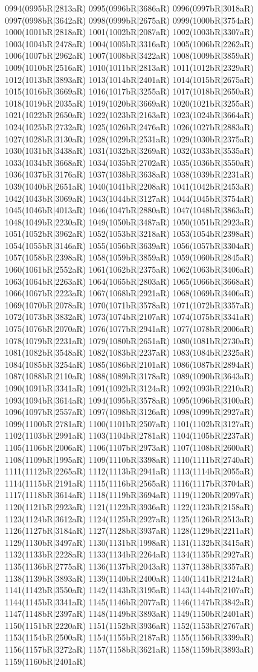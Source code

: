 0994(0995bR|2813aR) 0995(0996bR|3686aR) 0996(0997bR|3018aR) 0997(0998bR|3642aR) 0998(0999bR|2675aR) 0999(1000bR|3754aR) 1000(1001bR|2818aR) 1001(1002bR|2087aR) 1002(1003bR|3307aR) 1003(1004bR|2478aR) 1004(1005bR|3316aR) 1005(1006bR|2262aR) 1006(1007bR|2962aR) 1007(1008bR|3422aR) 1008(1009bR|3859aR) 1009(1010bR|2516aR) 1010(1011bR|2813aR) 1011(1012bR|2329aR) 1012(1013bR|3893aR) 1013(1014bR|2401aR) 1014(1015bR|2675aR) 1015(1016bR|3669aR) 1016(1017bR|3255aR) 1017(1018bR|2650aR) 1018(1019bR|2035aR) 1019(1020bR|3669aR) 1020(1021bR|3255aR) 1021(1022bR|2650aR) 1022(1023bR|2163aR) 1023(1024bR|3664aR) 1024(1025bR|2732aR) 1025(1026bR|2476aR) 1026(1027bR|2883aR) 1027(1028bR|3130aR) 1028(1029bR|2531aR) 1029(1030bR|2375aR) 1030(1031bR|3438aR) 1031(1032bR|3269aR) 1032(1033bR|3535aR) 1033(1034bR|3668aR) 1034(1035bR|2702aR) 1035(1036bR|3550aR) 1036(1037bR|3176aR) 1037(1038bR|3638aR) 1038(1039bR|2231aR) 1039(1040bR|2651aR) 1040(1041bR|2208aR) 1041(1042bR|2453aR) 1042(1043bR|3069aR) 1043(1044bR|3127aR) 1044(1045bR|3754aR) 1045(1046bR|4013aR) 1046(1047bR|2880aR) 1047(1048bR|3863aR) 1048(1049bR|2230aR) 1049(1050bR|3487aR) 1050(1051bR|2923aR) 1051(1052bR|3962aR) 1052(1053bR|3218aR) 1053(1054bR|2398aR) 1054(1055bR|3146aR) 1055(1056bR|3639aR) 1056(1057bR|3304aR) 1057(1058bR|2398aR) 1058(1059bR|3859aR) 1059(1060bR|2845aR) 1060(1061bR|2552aR) 1061(1062bR|2375aR) 1062(1063bR|3406aR) 1063(1064bR|2263aR) 1064(1065bR|2803aR) 1065(1066bR|3668aR) 1066(1067bR|2223aR) 1067(1068bR|2921aR) 1068(1069bR|3406aR) 1069(1070bR|2078aR) 1070(1071bR|3578aR) 1071(1072bR|3357aR) 1072(1073bR|3832aR) 1073(1074bR|2107aR) 1074(1075bR|3341aR) 1075(1076bR|2070aR) 1076(1077bR|2941aR) 1077(1078bR|2006aR) 1078(1079bR|2231aR) 1079(1080bR|2651aR) 1080(1081bR|2730aR) 1081(1082bR|3548aR) 1082(1083bR|2237aR) 1083(1084bR|2325aR) 1084(1085bR|3254aR) 1085(1086bR|2101aR) 1086(1087bR|2894aR) 1087(1088bR|2110aR) 1088(1089bR|3178aR) 1089(1090bR|3643aR) 1090(1091bR|3341aR) 1091(1092bR|3124aR) 1092(1093bR|2210aR) 1093(1094bR|3614aR) 1094(1095bR|3578aR) 1095(1096bR|3100aR) 1096(1097bR|2557aR) 1097(1098bR|3126aR) 1098(1099bR|2927aR) 1099(1100bR|2781aR) 1100(1101bR|2507aR) 1101(1102bR|3127aR) 1102(1103bR|2991aR) 1103(1104bR|2781aR) 1104(1105bR|2237aR) 1105(1106bR|2006aR) 1106(1107bR|2973aR) 1107(1108bR|2600aR) 1108(1109bR|1995aR) 1109(1110bR|3398aR) 1110(1111bR|2740aR) 1111(1112bR|2265aR) 1112(1113bR|2941aR) 1113(1114bR|2055aR) 1114(1115bR|2191aR) 1115(1116bR|2565aR) 1116(1117bR|3704aR) 1117(1118bR|3614aR) 1118(1119bR|3694aR) 1119(1120bR|2097aR) 1120(1121bR|2923aR) 1121(1122bR|3936aR) 1122(1123bR|2158aR) 1123(1124bR|3612aR) 1124(1125bR|2927aR) 1125(1126bR|2513aR) 1126(1127bR|3184aR) 1127(1128bR|3937aR) 1128(1129bR|2211aR) 1129(1130bR|3497aR) 1130(1131bR|1998aR) 1131(1132bR|3415aR) 1132(1133bR|2228aR) 1133(1134bR|2264aR) 1134(1135bR|2927aR) 1135(1136bR|2775aR) 1136(1137bR|2043aR) 1137(1138bR|3357aR) 1138(1139bR|3893aR) 1139(1140bR|2400aR) 1140(1141bR|2124aR) 1141(1142bR|3550aR) 1142(1143bR|3195aR) 1143(1144bR|2107aR) 1144(1145bR|3341aR) 1145(1146bR|2077aR) 1146(1147bR|3842aR) 1147(1148bR|2397aR) 1148(1149bR|3893aR) 1149(1150bR|2401aR) 1150(1151bR|2220aR) 1151(1152bR|3936aR) 1152(1153bR|2767aR) 1153(1154bR|2500aR) 1154(1155bR|2187aR) 1155(1156bR|3399aR) 1156(1157bR|3272aR) 1157(1158bR|3621aR) 1158(1159bR|3893aR) 1159(1160bR|2401aR) 